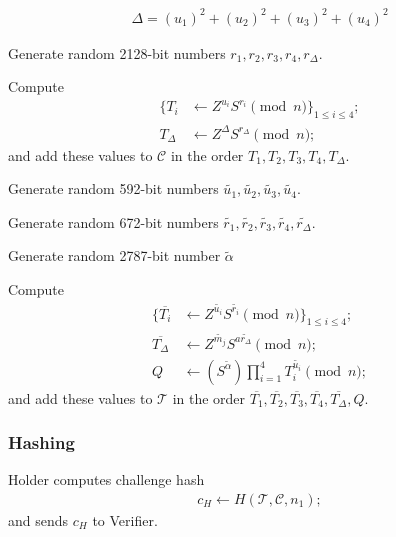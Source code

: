 \begin{legal}
\begin{legal}
\begin{align}
\Delta = (u_1)^2+ (u_2)^2+ (u_3)^2+ (u_4)^2
\end{align}
\item Generate random 2128-bit numbers $r_1,r_2,r_3,r_4, r_{\Delta}$.
\item Compute
\begin{align}
\{T_i &\leftarrow Z^{u_i}S^{r_i} \pmod{n}\}_{1 \leq i \leq 4};\\
T_{\Delta} &\leftarrow  Z^{\Delta}S^{r_{\Delta}} \pmod{n};
\end{align}
and add these values to $\mathcal{C}$ in the order $T_1,T_2,T_3,T_4,T_{\Delta}$.
\item Generate random 592-bit numbers $\widetilde{u_1},\widetilde{u_2},\widetilde{u_3},\widetilde{u_4}$.
\item Generate random 672-bit numbers $\widetilde{r_1},\widetilde{r_2},\widetilde{r_3},\widetilde{r_4},\widetilde{r_{\Delta}}$.
\item Generate random 2787-bit number $\widetilde{\alpha}$
\item Compute
\begin{align}
\{\overline{T_i} &\leftarrow Z^{\widetilde{u_i}}S^{\widetilde{r_i}}\pmod{n}\}_{1 \leq i \leq 4};\\
\overline{T_{\Delta}} &\leftarrow  Z^{\widetilde{m_j}}S^{a \widetilde{r_{\Delta}}} \pmod{n};\\
Q &\leftarrow (S^{\widetilde{\alpha}})\prod_{i=1}^{4}{T_i^{\widetilde{u_i}}}\pmod{n};
\end{align}
and add these values to $\mathcal{T}$ in the order $\overline{T_1},\overline{T_2},\overline{T_3},\overline{T_4}, \overline{T_{\Delta}},Q$.
\end{legal}
\end{legal}
\subsubsection{Hashing}\label{sec:hash}

Holder computes challenge hash
\begin{align}
c_H \leftarrow H(\mathcal{T},\mathcal{C},n_1);
\end{align}
and sends $c_H$ to Verifier. 

